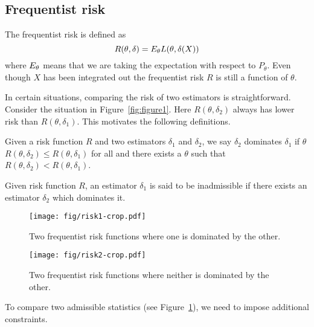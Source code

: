 \documentclass[twoside]{article}
\begin{document}
\subsection{Frequentist risk}

The frequentist risk is defined as
\begin{equation*}
R(\theta, \delta) = E_{\theta} L(\theta, \delta(X))
\end{equation*}
where $E_{\theta}$ means that we are taking the expectation with respect to
$P_{\theta}$. Even though $X$ has been integrated out the frequentist risk
$R$ is still a function of $\theta$.

In certain situations, comparing the risk of two estimators is straightforward.
Consider the situation in Figure~\ref{fig:figure1}.  Here $R(\theta, \delta_2)$
always has lower risk than $R(\theta, \delta_1)$.  This motivates the following
definitions.

\begin{definition}\label{def:dominate}
  Given a risk function $R$ and two estimators $\delta_1$ and $\delta_2$,
  we say $\delta_2$ dominates $\delta_1$ if $\theta$ $R(\theta, \delta_2)
  \leq R(\theta, \delta_1)$ for all and there exists a $\theta$ such that $R(\theta,
  \delta_2) < R(\theta, \delta_1)$.
\end{definition}

\begin{definition}\label{def:inadmissable}
  Given risk function $R$, an estimator $\delta_1$ is said to be
  inadmissible if there exists an estimator $\delta_2$ which dominates it. 
\end{definition}

\begin{figure}[ht]
\begin{minipage}[b]{0.45\linewidth}
\centering
\texttt{[image: fig/risk1-crop.pdf]}
\caption{Two frequentist risk functions where one is dominated by the other.}
\label{fig:figure1}
\end{minipage}
\hspace{0.5cm}
\begin{minipage}[b]{0.45\linewidth}
\centering
\texttt{[image: fig/risk2-crop.pdf]}
\caption{Two frequentist risk functions where neither is dominated by the other.}
\label{fig:figure2}
\end{minipage}
\end{figure}

To compare two admissible statistics (see Figure~\ref{fig:figure2}), we need
to impose additional constraints.
\end{document}
